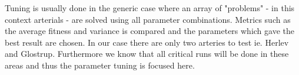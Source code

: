 Tuning is usually done in the generic case where an array of "problems" - in this context arterials - are solved using all parameter combinations. Metrics such as the average fitness and variance is compared and the parameters which gave the best result are chosen. In our case there are only two arteries to test ie. Herlev and Glostrup. Furthermore we know that all critical runs will be done in these areas and thus the parameter tuning is focused here.

\begin{figure}[htbp]
\centering
{}



\end{figure}

